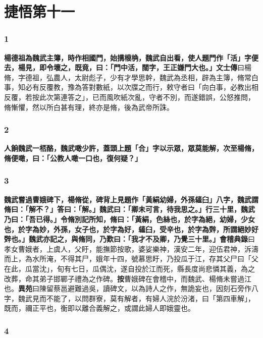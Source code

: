 \chapter{捷悟第十一}

\subsection*{1}

\textbf{楊德祖為魏武主簿，時作相國門，始搆榱桷，魏武自出看，使人題門作「活」字便去，楊見，即令壞之，既竟，曰：「門中活，闊字，王正嫌門大也。」}{\footnotesize \textbf{文士傳}曰楊脩，字德祖，弘農人，太尉彪子，少有才學思幹，魏武為丞相，辟為主簿，脩常白事，知必有反覆教，豫為答對數紙，以次牒之而行，敕守者曰「向白事，必教出相反覆，若按此次第連答之」，已而風吹紙次亂，守者不別，而遂錯誤，公怒推問，脩慚懼，然以所白甚有理，終亦是脩，後為武帝所誅。}

\subsection*{2}

\textbf{人餉魏武一桮酪，魏武噉少許，蓋頭上題「合」字以示眾，眾莫能解，次至楊脩，脩便噉，曰：「公教人噉一口也，復何疑？」}

\subsection*{3}

\textbf{魏武嘗過曹娥碑下，楊脩從，碑背上見題作「黃絹幼婦，外孫䪢臼」八字，魏武謂脩曰：「解不？」答曰：「解。」魏武曰：「卿未可言，待我思之。」行三十里，魏武乃曰：「吾已得。」令脩別記所知，脩曰：「黃絹，色絲也，於字為絕，幼婦，少女也，於字為妙，外孫，女子也，於字為好，䪢臼，受辛也，於字為辤，所謂絕妙好辤也。」魏武亦記之，與脩同，乃歎曰：「我才不及卿，乃覺三十里。」}{\footnotesize \textbf{會稽典錄}曰孝女曹娥者，上虞人，父盱，能撫節按歌，婆娑樂神，漢安二年，迎伍君神，泝濤而上，為水所淹，不得其尸，娥年十四，號慕思盱，乃投瓜于江，存其父尸曰「父在此，瓜當沈」，旬有七日，瓜偶沈，遂自投於江而死，縣長度尚悲憐其義，為之改葬，命其弟子邯鄲子禮為之作碑。\textbf{按}曹娥碑在會稽中，而魏武、楊脩未嘗過江也。\textbf{異苑}曰陳留蔡邕避難過吳，讀碑文，以為詩人之作，無詭妄也，因刻石旁作八字，魏武見而不能了，以問群寮，莫有解者，有婦人浣於汾渚，曰「第四車解」，既而，禰正平也，衡即以離合義解之，或謂此婦人即娥靈也。}

\subsection*{4}

